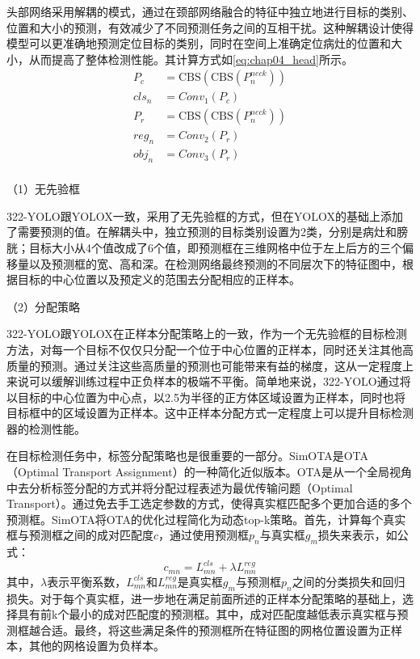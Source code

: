 头部网络采用解耦的模式，通过在颈部网络融合的特征中独立地进行目标的类别、位置和大小的预测，有效减少了不同预测任务之间的互相干扰。这种解耦设计使得模型可以更准确地预测定位目标的类别，同时在空间上准确定位病灶的位置和大小，从而提高了整体检测性能。其计算方式如\ref{eq:chap04_head}所示。
\begin{equation}
    \begin{aligned}
        P_c   & = \text{CBS}(\text{CBS}(P_n^{neck})) \\
        cls_n & = Conv_1(P_c)                        \\
        P_r   & = \text{CBS}(\text{CBS}(P_n^{neck})) \\
        reg_n & = Conv_2(P_r)                        \\
        obj_n & = Conv_3(P_r)                        \\
    \end{aligned}
    \label{eq:chap04_head}
\end{equation}



（1）无先验框

322-YOLO跟YOLOX一致，采用了无先验框的方式，但在YOLOX的基础上添加了需要预测的值。在解耦头中，独立预测的目标类别设置为2类，分别是病灶和膀胱；目标大小从4个值改成了6个值，即预测框在三维网格中位于左上后方的三个偏移量以及预测框的宽、高和深。在检测网络最终预测的不同层次下的特征图中，根据目标的中心位置以及预定义的范围去分配相应的正样本。

（2）分配策略

322-YOLO跟YOLOX在正样本分配策略上的一致，作为一个无先验框的目标检测方法，对每一个目标不仅仅只分配一个位于中心位置的正样本，同时还关注其他高质量的预测。通过关注这些高质量的预测也可能带来有益的梯度，这从一定程度上来说可以缓解训练过程中正负样本的极端不平衡。简单地来说，322-YOLO通过将以目标的中心位置为中心点，以2.5为半径的正方体区域设置为正样本，同时也将目标框中的区域设置为正样本。这中正样本分配方式一定程度上可以提升目标检测器的检测性能。

在目标检测任务中，标签分配策略也是很重要的一部分。SimOTA是OTA（Optimal Transport Assignment）\cite{ge2021ota}的一种简化近似版本。OTA是从一个全局视角中去分析标签分配的方式并将分配过程表述为最优传输问题（Optimal Transport）。通过免去手工选定参数的方式，使得真实框匹配多个更加合适的多个预测框。SimOTA将OTA的优化过程简化为动态top-k策略。首先，计算每个真实框与预测框之间的成对匹配度\(c\)，通过使用预测框\(p_n\)与真实框\(g_m\)损失来表示，如公式：
\begin{equation}
    c_{mn} = L^{cls}_{mn} + \lambda L^{reg}_{mn}
\end{equation}
其中，\(\lambda\)表示平衡系数，\(L^{cls}_{mn}\)和\(L^{reg}_{mn}\)是真实框\(g_m\)与预测框\(p_n\)之间的分类损失和回归损失。对于每个真实框，进一步地在满足前面所述的正样本分配策略的基础上，选择具有前k个最小的成对匹配度的预测框。其中，成对匹配度越低表示真实框与预测框越合适。最终，将这些满足条件的预测框所在特征图的网格位置设置为正样本，其他的网格设置为负样本。

